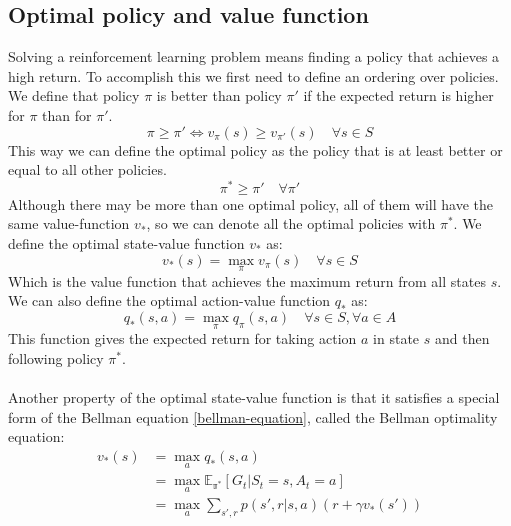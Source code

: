 \subsection{Optimal policy and value function}
Solving a reinforcement learning problem means finding a policy that achieves a high return. To accomplish this we first need to define an ordering over policies. We define that policy $\pi$ is better than policy $\pi'$ if the expected return is higher for $\pi$ than for $\pi'$.
\begin{equation}
    \pi \geq \pi' \iff v_{\pi}(s) \geq v_{\pi'}(s) \quad \forall s \in S
    \label{policy-ordering}
\end{equation}
This way we can define the optimal policy as the policy that is at least better or equal to all other policies.
\begin{equation}
    \pi^* \geq \pi' \quad \forall \pi'
    \label{optimal-policy}
\end{equation}
Although there may be more than one optimal policy, all of them will have the same value-function $v_*$, so we can denote all the optimal policies with $\pi^*$.
We define the optimal state-value function $v_*$ as:
\begin{equation}
    v_*(s) = \max_{\pi} v_{\pi}(s) \quad \forall s \in S
    \label{optimal-value-function}
\end{equation}
Which is the value function that achieves the maximum return from all states $s$. We can also define the optimal action-value function $q_*$ as:
\begin{equation}
    q_*(s, a) = \max_{\pi} q_{\pi}(s, a) \quad \forall s \in S, \forall a \in A
    \label{optimal-action-value-function}
\end{equation}
This function gives the expected return for taking action $a$ in state $s$ and then following policy $\pi^*$.\\\\
Another property of the optimal state-value function is that it satisfies a special form of the Bellman equation \eqref{bellman-equation}, called the Bellman optimality equation:
\begin{equation}
    \begin{split}
        v_{*}(s) & = \max_a q_*(s, a) \\
        & = \max_a \mathds{E_{\pi^*}}[G_t | S_t = s, A_t = a] \\
        & = \max_a \sum_{s', r} p(s', r | s, a) (r + \gamma v_*(s'))
    \end{split}
    \label{bellman-optimality-equation}
\end{equation}
